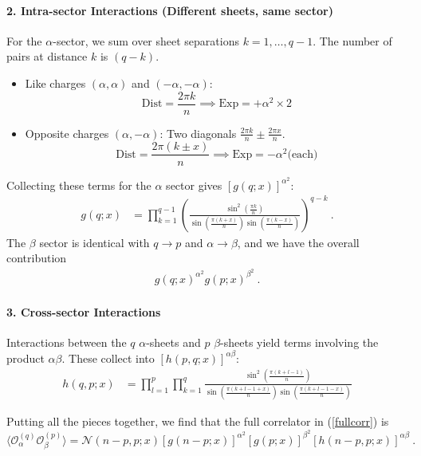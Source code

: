 \documentclass[11pt]{article}
\begin{document}
  \paragraph{2. Intra-sector Interactions (Different sheets, same sector)}
  For the $\alpha$-sector, we sum over sheet separations $k = 1, \dots, q-1$. The
  number of pairs at distance $k$ is $(q-k)$.
  \begin{itemize}
    \item Like charges $(\alpha, \alpha)$ and $(-\alpha, -\alpha)$:
      \[
        \text{Dist}= \frac{2\pi k}{n}\implies \text{Exp}= +\alpha^{2}\times 2
      \]

    \item Opposite charges $(\alpha, -\alpha)$: Two diagonals
      $\frac{2\pi k}{n}\pm \frac{2\pi x}{n}$.
      \[
        \text{Dist}= \frac{2\pi (k\pm x)}{n}\implies \text{Exp}= -\alpha^{2}\text{
        (each)}
      \]
  \end{itemize}
  Collecting these terms for the $\alpha$ sector gives $[g(q;x)]^{\alpha^2}$:
  \begin{eqnarray}
    g(q;x) &= \prod_{k=1}^{q-1} \left(
    \frac{\sin^{2}(\frac{\pi k}{n})}{\sin(\frac{\pi(k+x)}{n}) \sin(\frac{\pi(k-x)}{n})}
    \right)^{q-k} \ .
  \end{eqnarray}
  The $\beta$ sector is identical with $q \to p$ and $\alpha \to \beta$, and we
  have the overall contribution
  \begin{eqnarray}
    g(q;x)^{\alpha^2}g(p;x)^{\beta^2}\ .
  \end{eqnarray}

  \paragraph{3. Cross-sector Interactions}
  Interactions between the $q$ $\alpha$-sheets and $p$ $\beta$-sheets yield
  terms involving the product $\alpha \beta$. These collect into $[h(p,q;x)]^{\alpha\beta}$:
  \begin{align}
    \label{hfunct}h(q,p;x) & = \prod_{l=1}^{p}\prod_{k=1}^{q}\frac{\sin^{2}(\frac{\pi(k+l-1)}{n})}{\sin(\frac{\pi(k+l-1+x)}{n}) \sin(\frac{\pi(k+l-1-x)}{n})}
  \end{align}

  Putting all the pieces together, we find that the full correlator in (\ref{fullcorr})
  is
  \begin{equation}
    \label{eq:mixed_correlator}\langle \mathcal{O}_{\alpha}^{(q)}\mathcal{O}_{\beta}
    ^{(p)}\rangle = \mathcal{N}(n-p,p;x) \left[ g(n-p;x) \right]^{\alpha^2}\left[
    g(p;x) \right]^{\beta^2}\left[ h(n-p,p;x) \right]^{\alpha\beta}\ .
  \end{equation}
\end{document}
